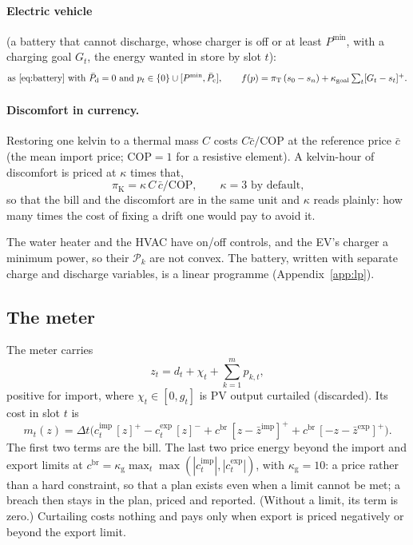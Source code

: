 \documentclass[11pt,a4paper]{article}
\newcommand{\dt}{\Delta t}
\newcommand{\cimp}{c^{\mathrm{imp}}}
\newcommand{\cexp}{c^{\mathrm{exp}}}
\newcommand{\cbr}{c^{\mathrm{br}}}
\newcommand{\zimp}{\bar z^{\mathrm{imp}}}
\newcommand{\zexp}{\bar z^{\mathrm{exp}}}
\newcommand{\Pk}{\mathcal P_k}
\begin{document}
\paragraph{Electric vehicle} (a battery that cannot discharge, whose charger is
off or at least $P^{\min}$, with a charging goal $G_t$, the energy wanted in store
by slot $t$):
\begin{equation}
  \text{as \eqref{eq:battery} with } \bar P_{\mathrm d} = 0 \text{ and } p_t \in \{0\} \cup [P^{\min}, \bar P_{\mathrm c}],
  \qquad f(p) = \pi_{\mathrm T}\,(s_0 - s_n) + \kappa_{\mathrm{goal}}\textstyle\sum_t [G_t - s_t]^+ .
  \label{eq:ev}
\end{equation}

\paragraph{Discomfort in currency.} Restoring one kelvin to a thermal mass $C$
costs $C\bar c/\mathrm{COP}$ at the reference price $\bar c$ (the mean import
price; $\mathrm{COP} = 1$ for a resistive element). A kelvin-hour of discomfort
is priced at $\kappa$ times that,
\begin{equation}
  \pi_{\mathrm K} = \kappa\,C\,\bar c/\mathrm{COP}, \qquad \kappa = 3 \text{ by default,}
  \label{eq:comfort}
\end{equation}
so that the bill and the discomfort are in the same unit and $\kappa$ reads
plainly: how many times the cost of fixing a drift one would pay to avoid it.

The water heater and the HVAC have on/off controls, and the EV's charger a
minimum power, so their $\Pk$ are not convex. The battery, written with separate
charge and discharge variables, is a linear programme (Appendix~\ref{app:lp}).

\subsection{The meter}

The meter carries
\begin{equation}
  z_t = d_t + \chi_t + \sum_{k=1}^m p_{k,t},
  \label{eq:meter}
\end{equation}
positive for import, where $\chi_t \in [0, g_t]$ is PV output curtailed
(discarded). Its cost in slot $t$ is
\begin{equation}
  m_t(z) = \dt\Big(\cimp_t\,[z]^+ - \cexp_t\,[z]^-
         + \cbr\,[z - \zimp]^+ + \cbr\,[-z - \zexp]^+\Big).
  \label{eq:metercost}
\end{equation}
The first two terms are the bill. The last two price energy beyond the import
and export limits at $\cbr = \kappa_{\mathrm g}\max_t
\max(|\cimp_t|,|\cexp_t|)$, with $\kappa_{\mathrm g} = 10$: a price rather than
a hard constraint, so that a plan exists even when a limit cannot be met; a
breach then stays in the plan, priced and reported. (Without a limit, its term
is zero.) Curtailing costs nothing and pays only when export is priced
negatively or beyond the export limit.
\end{document}
